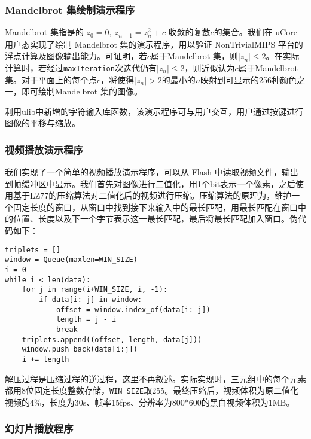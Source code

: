 
\subsubsection{Mandelbrot 集绘制演示程序}

Mandelbrot 集指是的 $z_0 = 0,~z_{n+1} = z_n^2+c$ 收敛的复数$c$的集合。我们在 uCore 用户态实现了绘制 Mandelbrot 集的演示程序，用以验证 NonTrivialMIPS 平台的浮点计算及图像输出能力。可证明，若$c$属于Mandelbrot 集，则$|z_n|\leq 2$。在实际计算时，若经过\texttt{maxIteration}次迭代仍有$|z_n|\leq 2$，则近似认为$c$属于Mandelbrot 集。对于平面上的每个点$c$，将使得$|z_n|> 2$的最小的$n$映射到可显示的256种颜色之一，即可绘制Mandelbrot 集的图像。

利用ulib中新增的字符输入库函数，该演示程序可与用户交互，用户通过按键进行图像的平移与缩放。

\subsubsection{视频播放演示程序}

我们实现了一个简单的视频播放演示程序，可以从 Flash 中读取视频文件，输出到帧缓冲区中显示。我们首先对图像进行二值化，用1个bit表示一个像素，之后使用基于LZ77的压缩算法对二值化后的视频进行压缩。压缩算法的原理为，维护一个固定长度的窗口，从窗口中找到接下来输入中的最长匹配，用最长匹配在窗口中的位置、长度以及下一个字节表示这一最长匹配，最后将最长匹配加入窗口。伪代码如下：

\begin{verbatim}
triplets = []
window = Queue(maxlen=WIN_SIZE)
i = 0
while i < len(data):
    for j in range(i+WIN_SIZE, i, -1):
        if data[i: j] in window:
            offset = window.index_of(data[i: j])
            length = j - i
            break
    triplets.append((offset, length, data[j]))
    window.push_back(data[i:j])
    i += length

\end{verbatim}

解压过程是压缩过程的逆过程，这里不再叙述。实际实现时，三元组中的每个元素都用8位固定长度整数存储，\texttt{WIN\_SIZE}取255。最终压缩后，视频体积为原二值化视频的4\%，长度为30s、帧率15fps、分辨率为800*600的黑白视频体积为1MB。

\subsubsection{幻灯片播放程序}

